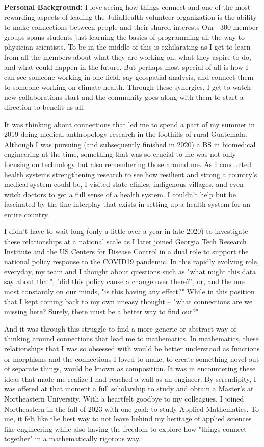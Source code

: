 \documentclass[11pt]{extarticle}
\begin{document}
\textbf{Personal Background:} I love seeing how things connect and one of the most rewarding aspects of leading the JuliaHealth volunteer organization is the ability to make connections between people and their shared interests
Our ~300 member groups spans students just learning the basics of programming all the way to physician-scientists.
To be in the middle of this is exhilarating as I get to learn from all the members about what they are working on, what they aspire to do, and what could happen in the future.
But perhaps most special of all is how I can see someone working in one field, say geospatial analysis, and connect them to someone working on climate health.
Through these synergies, I get to watch new collaborations start and the community goes along with them to start a direction to benefit us all.

It was thinking about connections that led me to spend a part of my summer in 2019 doing medical anthropology research in the foothills of rural Guatemala.
Although I was pursuing (and subsequently finished in 2020) a BS in biomedical engineering at the time, something that was so crucial to me was not only focusing on technology but also remembering those around me.
As I conducted health systems strengthening research to see how resilient and strong a country's medical system could be, I visited state clinics, indigenous villages, and even witch doctors to get a full sense of a health system.
I couldn't help but be fascinated by the fine interplay that exists in setting up a health system for an entire country.

I didn't have to wait long (only a little over a year in late 2020) to investigate these relationships at a national scale as I later joined Georgia Tech Research Institute and the US Centers for Disease Control in a dual role to support the national policy response to the COVID19 pandemic.
In this rapidly evolving role, everyday, my team and I thought about questions such as "what might this data say about that", "did this policy cause a change over there?", or, and the one most constantly on our minds, "is this having any effect?"
While in this position that I kept coming back to my own uneasy thought -- "what connections are we missing here? Surely, there must be a better way to find out?"

And it was through this struggle to find a more generic or abstract way of thinking around connections that lead me to mathematics.
In mathematics, these relationships that I was so obsessed with would be better understood as functions or morphisms and the connections I loved to make, to create something novel out of separate things, would be known as composition.
It was in encountering these ideas that made me realize I had reached a wall as an engineer.
By serendipity, I was offered at that moment a full scholarship to study and obtain a Master's at Northeastern University.
With a heartfelt goodbye to my colleagues, I joined Northeastern in the fall of 2023 with one goal: to study Applied Mathematics. 
To me, it felt like the best way to not leave behind my heritage of applied sciences like engineering while also having the freedom to explore how "things connect together" in a mathematically rigorous way.
\end{document}
